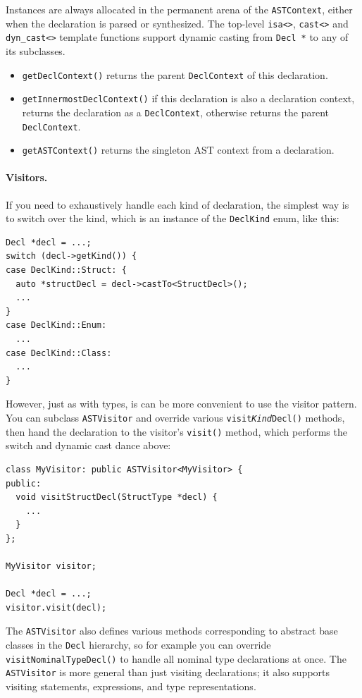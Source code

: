\documentclass[../generics]{subfiles}
\begin{document}
Instances are always allocated in the permanent arena of the \texttt{ASTContext}, either when the declaration is parsed or synthesized. The top-level \verb|isa<>|, \verb|cast<>| and \verb|dyn_cast<>| template functions support dynamic casting from \texttt{Decl *} to any of its subclasses.
\begin{itemize}
\item \texttt{getDeclContext()} returns the parent \texttt{DeclContext} of this declaration.
\item \texttt{getInnermostDeclContext()} if this declaration is also a declaration context, returns the declaration as a \texttt{DeclContext}, otherwise returns the parent \texttt{DeclContext}.
\item \texttt{getASTContext()} returns the singleton AST context from a declaration.
\end{itemize}

\paragraph{Visitors.}
If you need to exhaustively handle each kind of declaration, the simplest way is to switch over the kind, which is an instance of the \texttt{DeclKind} enum, like this:
\begin{Verbatim}
Decl *decl = ...;
switch (decl->getKind()) {
case DeclKind::Struct: {
  auto *structDecl = decl->castTo<StructDecl>();
  ...
}
case DeclKind::Enum:
  ...
case DeclKind::Class:
  ...
}
\end{Verbatim}
However, just as with types, is can be more convenient to use the visitor pattern. You can subclass \texttt{ASTVisitor} and override various \texttt{visit\emph{Kind}Decl()} methods, then hand the declaration to the visitor's \texttt{visit()} method, which performs the switch and dynamic cast dance above:
\begin{Verbatim}
class MyVisitor: public ASTVisitor<MyVisitor> {
public:
  void visitStructDecl(StructType *decl) {
    ...
  }
};

MyVisitor visitor;

Decl *decl = ...;
visitor.visit(decl);
\end{Verbatim}
The \texttt{ASTVisitor} also defines various methods corresponding to abstract base classes in the \texttt{Decl} hierarchy, so for example you can override \texttt{visitNominalTypeDecl()} to handle all nominal type declarations at once. The \texttt{ASTVisitor} is more general than just visiting declarations; it also supports visiting statements, expressions, and type representations.
\end{document}
